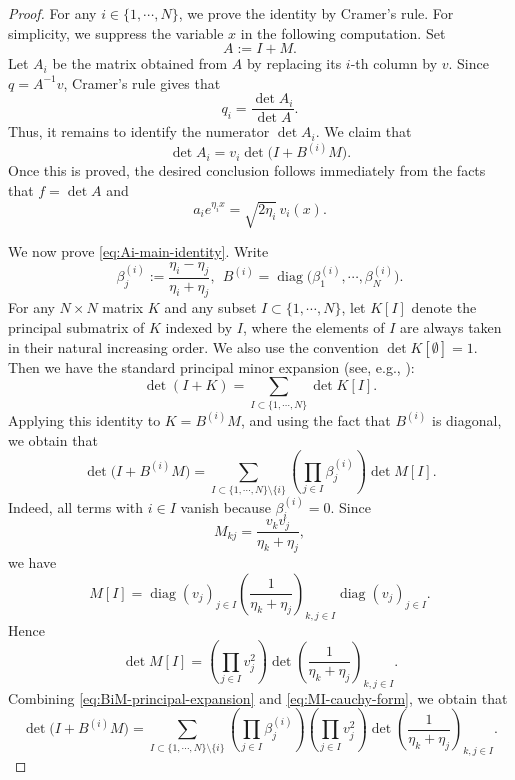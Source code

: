 \documentclass[11pt]{article}
\numberwithin{equation}{section}
\theoremstyle{definition}
\begin{document}
\begin{proof}
For any \(i\in\{1,\cdots,N\}\), we prove the identity by Cramer's rule.
For simplicity, we suppress the variable \(x\) in the following computation.
Set
\[
A:=I+M.
\]
Let \(A_i\) be the matrix obtained from \(A\) by replacing its \(i\)-th
column by \(v\). Since \(q=A^{-1}v\), Cramer's rule gives that
\begin{equation}\label{eq:q-cramer}
	q_i=\frac{\det A_i}{\det A}.
\end{equation}
Thus, it remains to identify the numerator \(\det A_i\). We claim that
\begin{equation}\label{eq:Ai-main-identity}
	\det A_i
	=
	v_i\det\bigl(I+B^{(i)}M\bigr).
\end{equation}
Once this is proved, the desired conclusion follows immediately from the facts that
\(f=\det A\) and
\[
a_i e^{\eta_i x}=\sqrt{2\eta_i}\,v_i(x).
\]



We now prove \eqref{eq:Ai-main-identity}. Write
\[
\beta_j^{(i)}
:=
\frac{\eta_i-\eta_j}{\eta_i+\eta_j},
\ \
B^{(i)}=\operatorname{diag}\bigl(\beta_1^{(i)},\cdots,\beta_N^{(i)}\bigr).
\]
For any \(N\times N\) matrix \(K\) and any subset
\(I\subset\{1,\cdots,N\}\), let \(K[I]\) denote the principal submatrix of
\(K\) indexed by \(I\), where the elements of \(I\) are always taken in their
natural increasing order. We also use the convention
\(\det K[\emptyset]=1\). Then we have the standard principal minor expansion (see, e.g., \cite[(1.2.13)]{HornJohnson2013}):
\[
\det(I+K)=\sum_{I\subset\{1,\cdots,N\}}\det K[I].
\]
Applying this identity to \(K=B^{(i)}M\), and using the fact that
\(B^{(i)}\) is diagonal, we obtain that
\begin{equation}\label{eq:BiM-principal-expansion}
	\det\bigl(I+B^{(i)}M\bigr)
	=
	\sum_{I\subset\{1,\cdots,N\}\setminus\{i\}}
	\left(\prod_{j\in I}\beta_j^{(i)}\right)\det M[I].
\end{equation}
Indeed, all terms with \(i\in I\) vanish because \(\beta_i^{(i)}=0\).
Since
\[
M_{kj}=\frac{v_kv_j}{\eta_k+\eta_j},
\]
we have
\[
M[I]
=
\operatorname{diag}(v_j)_{j\in I}
\left(\frac{1}{\eta_k+\eta_j}\right)_{k,j\in I}
\operatorname{diag}(v_j)_{j\in I}.
\]
Hence
\begin{equation}\label{eq:MI-cauchy-form}
	\det M[I]
	=
	\left(\prod_{j\in I}v_j^2\right)
	\det\left(\frac{1}{\eta_k+\eta_j}\right)_{k,j\in I}.
\end{equation}
Combining \eqref{eq:BiM-principal-expansion} and
\eqref{eq:MI-cauchy-form}, we obtain that
\begin{equation}\label{eq:BiM-expansion}
	\det\bigl(I+B^{(i)}M\bigr)
	=
	\sum_{I\subset\{1,\cdots,N\}\setminus\{i\}}
	\left(\prod_{j\in I}\beta_j^{(i)}\right)
	\left(\prod_{j\in I}v_j^2\right)
	\det\left(\frac{1}{\eta_k+\eta_j}\right)_{k,j\in I}.
\end{equation}


\end{proof}
\end{document}
